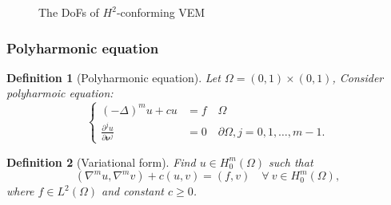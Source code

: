 \documentclass[notheorems,serif]{beamer}
\newtheorem{definition}{\textbf{Definition}}
\begin{document}
\begin{CJK}{UTF8}{gkai}
\begin{frame}
\begin{minipage}[b]{0.49\linewidth}
\begin{figure}[htpb]
        \caption{The DoFs of $H^2$-conforming VEM}
    \end{figure}
\end{minipage}
\end{frame}

\begin{frame}
\frametitle{Polyharmonic equation}

\begin{definition}[Polyharmonic equation]
  Let $\Omega = (0, 1)\times(0, 1)$, Consider polyharmoic equation:
  $$
  \left\{
  \begin{aligned}
      (-\Delta)^m u + c u & = f \quad \Omega\\
      \frac{\partial^j u}{\partial \boldsymbol{\nu}^j} & = 0 \quad \partial\Omega,
      j = 0, 1, \dots, m-1.
  \end{aligned}
  \right.
  $$
\end{definition}
\begin{definition}[Variational form]
Find $u\in H_0^m(\Omega)$ such that
$$
(\nabla^mu, \nabla^mv)+c(u, v)=(f, v)\quad\forall~v\in H_0^m(\Omega),
$$
where $f\in L^2(\Omega)$ and constant $c\geq0$.
\end{definition}
\hspace*{\fill} \\
\hspace*{\fill} \\
\hspace*{\fill} \\
\hspace*{\fill} \\
\hspace*{\fill} \\
\end{frame}



\end{CJK}
\end{document}

